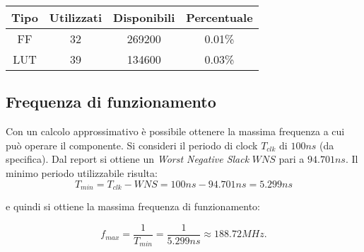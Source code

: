 \begin{table}[!htb]
	\centering
	\setlength{\belowcaptionskip}{-0.5cm}
	
	\begin{tabular}{ |c|c|c|c| }
		\hline
		\textbf{Tipo} & \textbf{Utilizzati} & \textbf{Disponibili} & \textbf{Percentuale} \\
		\hline
		FF & 32 & 269200 & 0.01\%\\ \hline
		LUT & 39 & 134600 & 0.03\%\\
		\hline
	\end{tabular}
	
	\caption{}
	\label{table:area}	
\end{table}


\subsection{Frequenza di funzionamento}
Con un calcolo approssimativo è possibile ottenere la massima frequenza a cui può operare il componente. Si consideri il periodo di clock $T_{clk}$ di $100 ns$ (da specifica). Dal report si ottiene un \textit{Worst Negative Slack} $WNS$ pari a $94.701 ns$. Il minimo periodo utilizzabile risulta:
\abovedisplayshortskip=5pt
\belowdisplayshortskip=8pt
\begin{equation*}
	T_{min} = T_{clk} - WNS = 100 ns - 94.701 ns = 5.299 ns
\end{equation*}


e quindi si ottiene la massima frequenza di funzionamento:

\abovedisplayshortskip=5pt
\belowdisplayshortskip=0pt
\begin{equation*}
	f_{max} = \frac{1}{T_{min}} = \frac{1}{5.299 ns} \approx 188.72 MHz.
\end{equation*}

